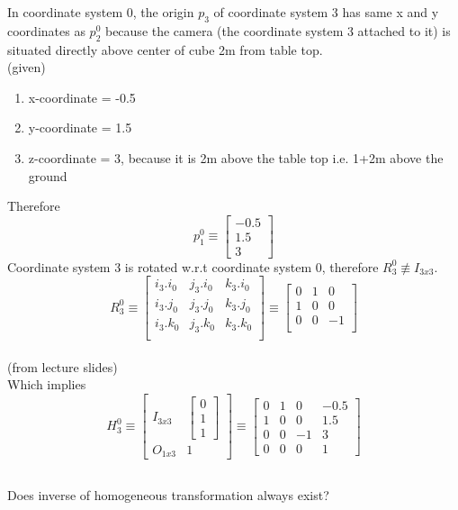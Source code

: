 \documentclass[12pt]{article}
\newcommand{\fromslides}{{\\ \color{blue} \hspace*{\fill}(from lecture slides)} \\}
\newcommand{\given}{{\\ \color{blue} \hspace*{\fill}(given)} \\}
\begin{document}
In coordinate system 0, the origin $ p_{3} $ of coordinate system 3 has same x and y coordinates as $ p_{2}^{0} $ because the camera (the coordinate system 3 attached to it) is situated directly above center of cube 2m from table top.
\given
\begin{enumerate}[nolistsep]
  \item x-coordinate = -0.5
  \item y-coordinate = 1.5
  \item z-coordinate = 3, because it is 2m above the table top i.e. 1+2m above the ground
\end{enumerate}
Therefore
\[
  p_{1}^{0} \equiv \begin{bmatrix} -0.5 \\ 1.5 \\ 3 \end{bmatrix}
\]
Coordinate system 3 is rotated w.r.t coordinate system 0, therefore $ R_{3}^{0} \not\equiv I_{3x3} $.
\[
  R_{3}^{0}
  \equiv \begin{bmatrix}
        i_3.i_0 & j_3.i_0 & k_3.i_0\\
        i_3.j_0 & j_3.j_0 & k_3.j_0\\
        i_3.k_0 & j_3.k_0 & k_3.k_0\\
        \end{bmatrix}
  \equiv \begin{bmatrix}
        0 & 1 & 0\\
        1 & 0 & 0\\
        0 & 0 & -1\\
        \end{bmatrix}
\]
\fromslides

Which implies
\[
  H_{3}^{0}
  \equiv \begin{bmatrix} I_{3x3} & \begin{bmatrix} 0 \\ 1 \\ 1 \end{bmatrix} \\ O_{1x3} & 1 \end{bmatrix}
  \equiv \begin{bmatrix}
          0 & 1 & 0 & -0.5\\
          1 & 0 & 0 & 1.5\\
          0 & 0 & -1 & 3\\
          0 & 0 & 0 & 1
        \end{bmatrix}
\]

\subsection{}
{\color{red} Does inverse of homogeneous transformation always exist?}
\end{document}
